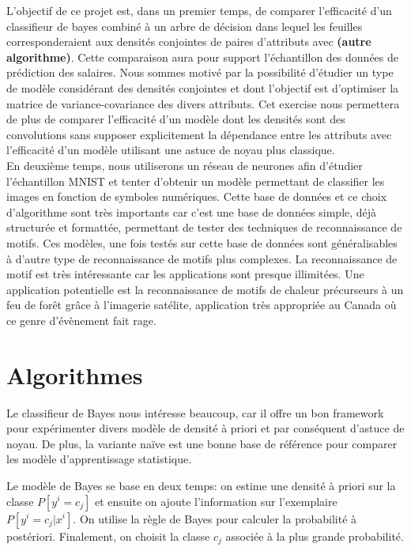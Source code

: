 \documentclass[12pt,letterpaper]{article}
\begin{document}
L'objectif de ce projet est, dans un premier temps, de comparer l'efficacité
d'un classifieur de bayes combiné à un arbre de décision dans lequel les
feuilles corresponderaient aux densités conjointes de paires d'attributs avec
\textbf{(autre algorithme)}. Cette comparaison aura pour support l'échantillon des
données de prédiction des salaires. Nous sommes motivé par la possibilité d'étudier 
un type de modèle considérant des densités conjointes et dont l'objectif est 
d'optimiser la matrice de variance-covariance des divers attributs. Cet exercise 
nous permettera de plus de comparer l'efficacité d'un modèle dont les densités 
sont des convolutions sans supposer explicitement la dépendance entre les 
attributs avec l'efficacité d'un modèle utilisant une astuce de noyau plus classique. \\

En deuxième temps, nous utiliserons un réseau de neurones afin d'étudier 
l'échantillon MNIST et tenter d'obtenir un modèle permettant de classifier les 
images en fonction de symboles numériques. Cette base de données et ce choix 
d'algorithme sont très importants car c'est une base de données simple, déjà 
structurée et formattée, permettant de tester des techniques de reconnaissance 
de motifs. Ces modèles, une fois testés sur cette base de données sont 
généralisables à d'autre type de reconnaissance de motifs plus complexes. 
La reconnaissance de motif est très intéressante car les 
applications sont presque illimitées. Une application potentielle est la 
reconnaissance de motifs de chaleur précurseurs à un feu de forêt grâce à 
l'imagerie satélite, application très appropriée au Canada où ce genre 
d'évènement fait rage. \\


\section{Algorithmes}

Le classifieur de Bayes nous intéresse beaucoup, car il offre un bon framework
pour expérimenter divers modèle de densité à priori et par conséquent d'astuce
de noyau. De plus, la variante naïve est une bonne base de référence pour
comparer les modèle d'apprentissage statistique.

Le modèle de Bayes se base en deux temps: on estime une densité à priori sur la
classe $P[y^i = c_j]$ et ensuite on ajoute l'information sur l'exemplaire
$P[y^i = c_j | x^i]$. On utilise la règle de Bayes pour calculer la probabilité
à postériori. Finalement, on choisit la classe $c_j$ associée à la plus grande
probabilité.
\end{document}
